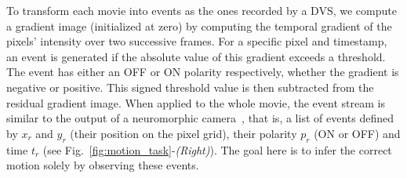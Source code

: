 \documentclass[default]{sn-jnl}%
\theoremstyle{thmstyleone}%
\theoremstyle{thmstyletwo}%
\theoremstyle{thmstylethree}%
\newcommand{\seeFig}[1]{see Fig.~\ref{fig:#1}}%
\newcommand{\arank}{r} %
\newcommand{\timev}{t} %
\newcommand{\polev}{p} %
\newcommand{\note}[1]{{\sethlcolor{yellow}\hl{#1}}}
\begin{document}
To transform each movie into events as the ones recorded by a DVS, we compute a gradient image (initialized at zero) by computing the temporal gradient of the pixels' intensity over two successive frames. For a specific pixel and timestamp, an event is generated if the absolute value of this gradient exceeds a threshold. The event has either an OFF or ON polarity respectively, whether the gradient is negative or positive. This signed threshold value is then subtracted from the residual gradient image. When applied to the whole movie, the event stream is similar to the output of a neuromorphic camera~\citep{rasetto_challenges_2022}, that is, a list of events defined by $x_\arank$ and $y_\arank$ (their position on the pixel grid), their polarity $\polev_\arank$ (ON or OFF) and time $\timev_\arank$  (\seeFig{motion_task}-\textit{(Right)}). The goal here is to infer the correct motion solely by observing these events. 
\end{document}
